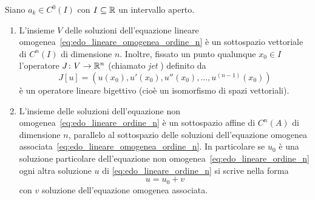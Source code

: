 \begin{theorem}%
\label{th:edo_lineare_ordine_n}%
\mymark{***}%
Siano $a_k\in C^0(I)$ con $I\subseteq {\mathbb R}$
un intervallo aperto.

\begin{enumerate}
\item
L'insieme $V$ delle soluzioni dell'equazione lineare omogenea~\eqref{eq:edo_lineare_omogenea_ordine_n}
è un sottospazio vettoriale di $C^n(I)$ di dimensione $n$.
Inoltre, fissato un punto qualunque $x_0\in I$ l'operatore $J\colon V \to {\mathbb R}^n$
(chiamato \emph{jet}%
) definito da
\begin{equation}\label{eq:jet}
  J[u] = (u(x_0), u'(x_0), u''(x_0), \dots, u^{(n-1)}(x_0))
\end{equation}
è un operatore lineare bigettivo (cioè un isomorfismo di spazi vettoriali).

\item
L'insieme delle soluzioni dell'equazione non omogenea~\eqref{eq:edo_lineare_ordine_n}
è un sottospazio affine di $C^n(A)$ di dimensione $n$,
parallelo al sottospazio delle soluzioni dell'equazione omogenea
associata~\eqref{eq:edo_lineare_omogenea_ordine_n}.
In particolare se $u_0$ è una soluzione particolare dell'equazione non
omogenea~\eqref{eq:edo_lineare_ordine_n} ogni altra soluzione $u$ di
\eqref{eq:edo_lineare_ordine_n} si scrive nella forma
\[
  u = u_0 + v
\]
con $v$ soluzione dell'equazione omogenea associata.
\end{enumerate}
\end{theorem}
%

